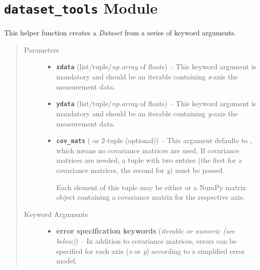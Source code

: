 \documentclass[a4paper,10pt,english]{sphinxmanual}
\begin{document}
\section{\texttt{dataset\_tools} Module}
\label{index:module-kafe.dataset_tools}\label{index:dataset-tools-module}\label{index:module-dataset_tools}

\begin{fulllineitems}
\label{index:kafe.dataset_tools.build_dataset}
This helper function creates a \emph{Dataset} from a series of keyword
arguments.
\begin{quote}\begin{description}
\item[{Parameters}] \leavevmode\begin{itemize}
\item {} 
\textbf{\texttt{xdata}} (list/tuple/\emph{np.array} of floats) -- This keyword argument is mandatory and should be an iterable
containing \emph{x}-axis the measurement data.

\item {} 
\textbf{\texttt{ydata}} (list/tuple/\emph{np.array} of floats) -- This keyword argument is mandatory and should be an iterable
containing \emph{y}-axis the measurement data.

\item {} 
\textbf{\texttt{cov\_mats}} ( or 2-tuple (optional)) -- 
This argument defaults to , which means no covariance matrices
are used. If covariance matrices are needed, a tuple with two entries
(the first for \emph{x} covariance matrices, the second for \emph{y}) must be
passed.

Each element of this tuple may be either  or a NumPy matrix
object containing a covariance matrix for the respective axis.


\end{itemize}

\item[{Keyword Arguments}] \leavevmode\begin{itemize}
\item {} 
\textbf{error specification keywords} (\emph{iterable or numeric (see below)}) --
In addition to covariance matrices, errors can be specified for each
axis (\emph{x} or \emph{y}) according to a simplified error model.


\end{itemize}
\end{description}
\end{quote}
\end{fulllineitems}
\end{document}
